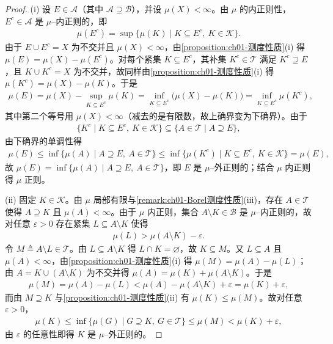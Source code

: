 \documentclass[../../main.tex]{subfiles}%
\begin{document}
\begin{proof}
(i) 设 $E\in\mathcal{A}$（其中 $\mathcal{A}\supseteq\mathcal{B}$），并设 $\mu(X)<\infty$。由 $\mu$ 的内正则性，$E^c\in\mathcal{A}$ 是 $\mu$--内正则的，即
\begin{align*}
\mu(E^c)=\sup\{\mu(K)\mid K\subseteq E^c,\ K\in\mathcal{K}\}.
\end{align*}
由于 $E\cup E^c=X$ 为不交并且 $\mu(X)<\infty$，由\cref{proposition:ch01-测度性质}(i) 得 $\mu(E)=\mu(X)-\mu(E^c)$。对每个紧集 $K\subseteq E^c$，其补集 $K^c\in\mathcal{T}$ 满足 $K^c\supseteq E$，且 $K\cup K^c=X$ 为不交并，故同样由\cref{proposition:ch01-测度性质}(i) 得 $\mu(K^c)=\mu(X)-\mu(K)$。于是
\begin{align*}
\mu(E)=\mu(X)-\sup_{K\subseteq E^c}\mu(K)=\inf_{K\subseteq E^c}\bigl(\mu(X)-\mu(K)\bigr)=\inf_{K\subseteq E^c}\mu(K^c),
\end{align*}
其中第二个等号用 $\mu(X)<\infty$（减去的是有限数，故上确界变为下确界）。由于
\begin{align*}
\{K^c\mid K\subseteq E^c,\ K\in\mathcal{K}\}\subseteq\{A\in\mathcal{T}\mid A\supseteq E\},
\end{align*}
由下确界的单调性得
\begin{align*}
\mu(E)\leqslant\inf\{\mu(A)\mid A\supseteq E,\ A\in\mathcal{T}\}\leqslant\inf\{\mu(K^c)\mid K\subseteq E^c,\ K\in\mathcal{K}\}=\mu(E),
\end{align*}
故 $\mu(E)=\inf\{\mu(A)\mid A\supseteq E,\ A\in\mathcal{T}\}$，即 $E$ 是 $\mu$--外正则的；结合 $\mu$ 内正则得 $\mu$ 正则。

(ii) 固定 $K\in\mathcal{K}$。由 $\mu$ 局部有限与\cref{remark:ch01-Borel测度性质}(iii)，存在 $A\in\mathcal{T}$ 使得 $A\supseteq K$ 且 $\mu(A)<\infty$。由于 $\mu$ 内正则，集合 $A\setminus K\in\mathcal{B}$ 是 $\mu$--内正则的，故对任意 $\varepsilon>0$ 存在紧集 $L\subseteq A\setminus K$ 使得
\begin{align*}
\mu(L)>\mu(A\setminus K)-\varepsilon.
\end{align*}
令 $M\triangleq A\setminus L\in\mathcal{T}$。由 $L\subseteq A\setminus K$ 得 $L\cap K=\varnothing$，故 $K\subseteq M$。又 $L\subseteq A$ 且 $\mu(A)<\infty$，由\cref{proposition:ch01-测度性质}(i) 得 $\mu(M)=\mu(A)-\mu(L)$；由 $A=K\cup(A\setminus K)$ 为不交并得 $\mu(A)=\mu(K)+\mu(A\setminus K)$。于是
\begin{align*}
\mu(M)=\mu(A)-\mu(L)<\mu(A)-\mu(A\setminus K)+\varepsilon=\mu(K)+\varepsilon,
\end{align*}
而由 $M\supseteq K$ 与\cref{proposition:ch01-测度性质}(ii) 有 $\mu(K)\leqslant\mu(M)$。故对任意 $\varepsilon>0$，
\begin{align*}
\mu(K)\leqslant\inf\{\mu(G)\mid G\supseteq K,\ G\in\mathcal{T}\}\leqslant\mu(M)<\mu(K)+\varepsilon,
\end{align*}
由 $\varepsilon$ 的任意性即得 $K$ 是 $\mu$--外正则的。
\end{proof}
\end{document}
